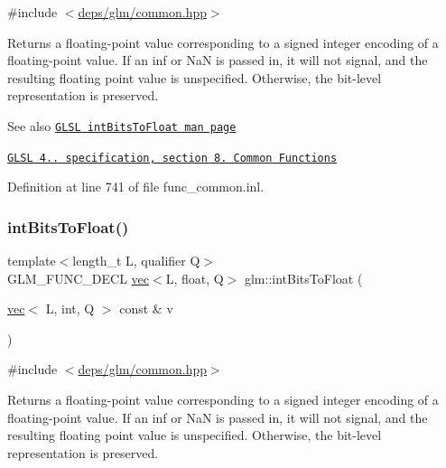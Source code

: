 {\ttfamily \#include $<$\hyperlink{common_8hpp}{deps/glm/common.\+hpp}$>$}

Returns a floating-\/point value corresponding to a signed integer encoding of a floating-\/point value. If an inf or NaN is passed in, it will not signal, and the resulting floating point value is unspecified. Otherwise, the bit-\/level representation is preserved.

\begin{DoxySeeAlso}{See also}
\href{http://www.opengl.org/sdk/docs/manglsl/xhtml/intBitsToFloat.xml}{\tt G\+L\+SL int\+Bits\+To\+Float man page} 

\href{http://www.opengl.org/registry/doc/GLSLangSpec.4.20.8.pdf}{\tt G\+L\+SL 4.. specification, section 8. Common Functions} 
\end{DoxySeeAlso}


Definition at line 741 of file func\+\_\+common.\+inl.

\mbox{\label{group__core__func__common_ga7a0a8291a1cf3e1c2aee33030a1bd7b0}} 
\subsubsection{\texorpdfstring{int\+Bits\+To\+Float()}{intBitsToFloat()}\hspace{0.1cm}{\footnotesize\ttfamily [2/2]}}
{\footnotesize\ttfamily template$<$length\+\_\+t L, qualifier Q$>$ \\
G\+L\+M\+\_\+\+F\+U\+N\+C\+\_\+\+D\+E\+CL \hyperlink{structglm_1_1vec}{vec}$<$L, float, Q$>$ glm\+::int\+Bits\+To\+Float (\begin{DoxyParamCaption}\item[{\hyperlink{structglm_1_1vec}{vec}$<$ L, int, Q $>$ const \&}]{v }\end{DoxyParamCaption})}



{\ttfamily \#include $<$\hyperlink{common_8hpp}{deps/glm/common.\+hpp}$>$}

Returns a floating-\/point value corresponding to a signed integer encoding of a floating-\/point value. If an inf or NaN is passed in, it will not signal, and the resulting floating point value is unspecified. Otherwise, the bit-\/level representation is preserved.


